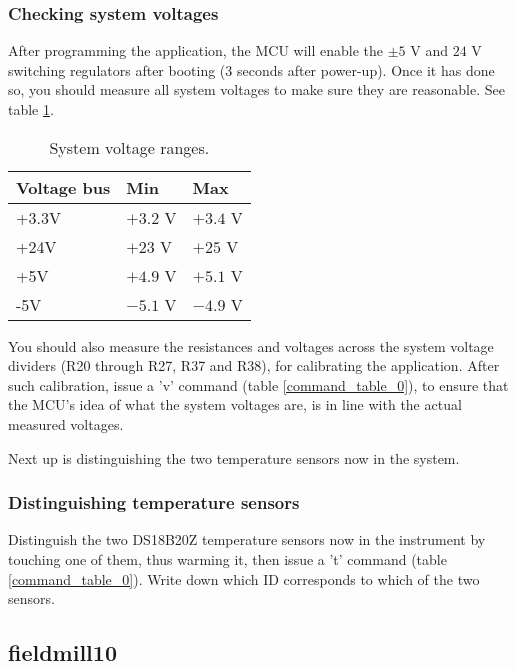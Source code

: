 \documentclass{article}
\begin{document}
\subsubsection{Checking system voltages}

After programming the application,
the MCU will enable the $\pm 5$ V and $24$ V switching regulators after booting (3 seconds after power-up).
Once it has done so, you should measure all system voltages to make sure they are reasonable.
See table \ref{system_voltages}.

\begin{table}[H]
\begin{centering}
\begin{tabular}{|l|l|l|}
\hline
{\bf Voltage bus} & {\bf Min}    & {\bf Max}\\ \hline
+3.3V             & $+3.2$ V     & $+3.4$ V \\ \hline
+24V              & $+23$  V     & $+25$  V \\ \hline
+5V               & $+4.9$ V     & $+5.1$ V \\ \hline
-5V               & $-5.1$ V     & $-4.9$ V \\ \hline
\end{tabular}
\caption{System voltage ranges.}
\label{system_voltages}
\end{centering}
\end{table}

You should also measure the resistances and voltages across the system voltage dividers
(R20 through R27, R37 and R38), for calibrating the application.
After such calibration, issue a 'v' command (table \ref{command_table_0}),
to ensure that the MCU's idea of what the system voltages are, is in line with the actual measured voltages.

Next up is distinguishing the two temperature sensors now in the system.

\subsubsection{Distinguishing temperature sensors}

Distinguish the two DS18B20Z temperature sensors now in the instrument by touching one of them, thus warming it, then issue a 't' command (table \ref{command_table_0}).
Write down which ID corresponds to which of the two sensors.

\subsection{fieldmill10}
\end{document}
